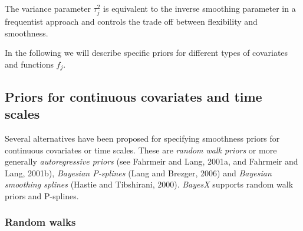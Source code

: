 \documentclass[11pt,a4paper,twoside]{bayesxarticle}
\begin{document}
The variance parameter $\tau_j^2$ is  equivalent to the inverse
smoothing parameter in a frequentist approach and controls the
trade off between flexibility and smoothness.

In the following we will describe specific priors for different
types of covariates and functions $f_j$.


\subsection{Priors for continuous covariates and time scales}
\label{psplines}

Several alternatives have been  proposed for specifying smoothness
priors for continuous covariates or time scales. These are {\em
random walk priors} or more generally {\em autoregressive priors}
(see Fahrmeir and Lang, 2001a, and Fahrmeir and Lang, 2001b), {\em
Bayesian P-splines} (Lang and Brezger, 2006) and {\em Bayesian
smoothing splines} (Hastie and Tibshirani, 2000). {\em BayesX}
supports random walk priors and P-splines.

\subsubsection{Random walks}
\end{document}
